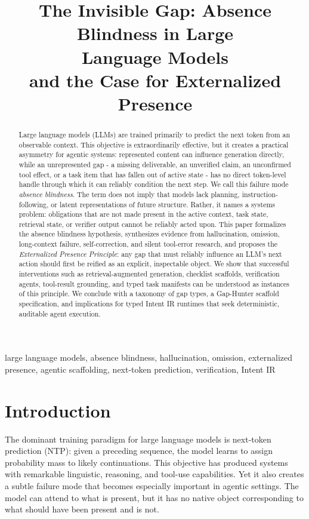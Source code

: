 \documentclass[10pt,conference]{IEEEtran}
\title{The Invisible Gap: Absence Blindness in Large\\
Language Models\\
and the Case for Externalized Presence}
\author{\IEEEauthorblockN{Andres R Garcell}
\IEEEauthorblockA{\textit{Paxeer Research Foundation}\\
801 Brickell Ave, Miami FL\\
paxeer@hyperpaxeer.com}}
\begin{document}
\maketitle

\begin{abstract}
Large language models (LLMs) are trained primarily to predict the next token from an observable context. This objective is extraordinarily effective, but it creates a practical asymmetry for agentic systems: represented content can influence generation directly, while an unrepresented gap - a missing deliverable, an unverified claim, an unconfirmed tool effect, or a task item that has fallen out of active state - has no direct token-level handle through which it can reliably condition the next step. We call this failure mode \emph{absence blindness}. The term does not imply that models lack planning, instruction-following, or latent representations of future structure. Rather, it names a systems problem: obligations that are not made present in the active context, task state, retrieval state, or verifier output cannot be reliably acted upon. This paper formalizes the absence blindness hypothesis, synthesizes evidence from hallucination, omission, long-context failure, self-correction, and silent tool-error research, and proposes the \emph{Externalized Presence Principle}: any gap that must reliably influence an LLM's next action should first be reified as an explicit, inspectable object. We show that successful interventions such as retrieval-augmented generation, checklist scaffolds, verification agents, tool-result grounding, and typed task manifests can be understood as instances of this principle. We conclude with a taxonomy of gap types, a Gap-Hunter scaffold specification, and implications for typed Intent IR runtimes that seek deterministic, auditable agent execution.
\end{abstract}

\begin{IEEEkeywords}
large language models, absence blindness, hallucination, omission, externalized presence, agentic scaffolding, next-token prediction, verification, Intent IR
\end{IEEEkeywords}

\section{Introduction}
The dominant training paradigm for large language models is next-token prediction (NTP): given a preceding sequence, the model learns to assign probability mass to likely continuations. This objective has produced systems with remarkable linguistic, reasoning, and tool-use capabilities. Yet it also creates a subtle failure mode that becomes especially important in agentic settings. The model can attend to what is present, but it has no native object corresponding to what should have been present and is not.
\end{document}
